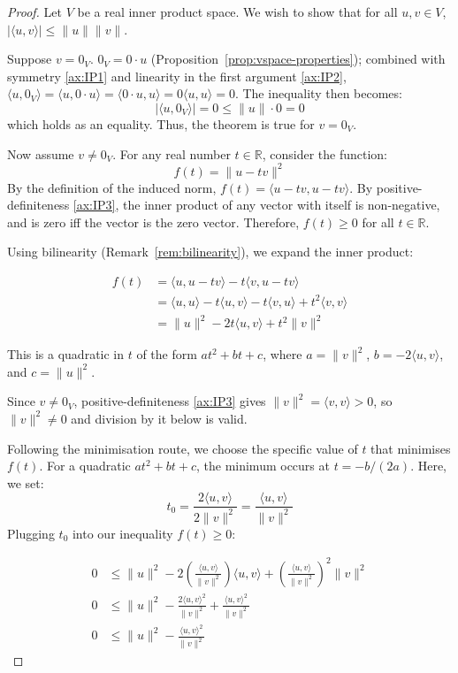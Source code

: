 		\begin{proof}
			Let $V$ be a real inner product space. We wish to show that for all $u, v \in V$, $|\langle u, v \rangle| \le \|u\| \|v\|$.
			
			Suppose $v = 0_V$. $0_V = 0 \cdot u$ (Proposition~\ref{prop:vspace-properties}); combined with symmetry \ref{ax:IP1} and linearity in the first argument \ref{ax:IP2}, $\langle u, 0_V \rangle = \langle u, 0 \cdot u \rangle = \langle 0\cdot u, u\rangle = 0\langle u,u\rangle = 0$. The inequality then becomes:
			\[ 
				|\langle u, 0_V \rangle| = 0 \le \|u\| \cdot 0 = 0
			\]
			which holds as an equality. Thus, the theorem is true for $v = 0_V$.
			
			Now assume $v \neq 0_V$. For any real number $t \in \mathbb{R}$, consider the function:
			\[ 
				f(t) = \|u - tv\|^2
			\]
			By the definition of the induced norm, $f(t) = \langle u - tv, u - tv \rangle$. By positive-definiteness \ref{ax:IP3}, the inner product of any vector with itself is non-negative, and is zero iff the vector is the zero vector. Therefore, $f(t) \ge 0$ for all $t \in \mathbb{R}$.
			
			Using bilinearity (Remark~\ref{rem:bilinearity}), we expand the inner product:
			
			\begin{align*}
				f(t) &= \langle u, u - tv \rangle - t\langle v, u - tv \rangle \\
				&= \langle u, u \rangle - t\langle u, v \rangle - t\langle v, u \rangle + t^2\langle v, v \rangle \\
				&= \|u\|^2 - 2t\langle u, v \rangle + t^2\|v\|^2
			\end{align*}
			
			This is a quadratic in $t$ of the form $at^2 + bt + c$, where $a = \|v\|^2$, $b = -2\langle u, v \rangle$, and $c = \|u\|^2$.
			
			Since $v \neq 0_V$, positive-definiteness \ref{ax:IP3} gives $\|v\|^2 = \langle v,v\rangle > 0$, so $\|v\|^2 \neq 0$ and division by it below is valid.
			
			Following the minimisation route, we choose the specific value of $t$ that minimises $f(t)$. For a quadratic $at^2 + bt + c$, the minimum occurs at $t = -b/(2a)$. Here, we set:
			\[
				t_0 = \frac{2\langle u, v \rangle}{2\|v\|^2} = \frac{\langle u, v \rangle}{\|v\|^2}
			\]
			Plugging $t_0$ into our inequality $f(t) \ge 0$:
			
			\begin{align*}
				0 &\le \|u\|^2 - 2\left(\frac{\langle u, v \rangle}{\|v\|^2}\right)\langle u, v \rangle + \left(\frac{\langle u, v \rangle}{\|v\|^2}\right)^2 \|v\|^2 \\
				0 &\le \|u\|^2 - \frac{2\langle u, v \rangle^2}{\|v\|^2} + \frac{\langle u, v \rangle^2}{\|v\|^2} \\
				0 &\le \|u\|^2 - \frac{\langle u, v \rangle^2}{\|v\|^2}
			\end{align*}
			

\end{proof}

